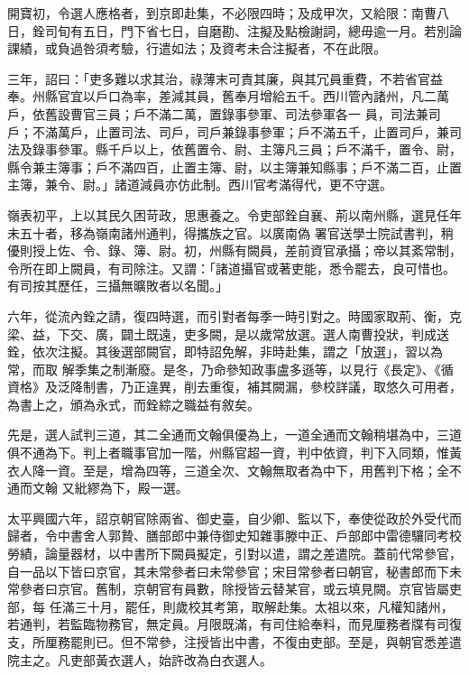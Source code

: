 \begin{pinyinscope}
 開寶初，令選人應格者，到京即赴集，不必限四時；及成甲次，又給限：南曹八日，銓司旬有五日，門下省七日，自磨勘、注擬及點檢謝詞，總毋逾一月。若別論課績，或負過咎須考驗，行遣如法；及資考未合注擬者，不在此限。



 三年，詔曰：「吏多難以求其治，祿薄末可責其廉，與其冗員重費，不若省官益奉。州縣官宜以戶口為率，差減其員，舊奉月增給五千。西川管內諸州，凡二萬戶，依舊設曹官三員；戶不滿二萬，置錄事參軍、司法參軍各一
 員，司法兼司戶；不滿萬戶，止置司法、司戶，司戶兼錄事參軍；戶不滿五千，止置司戶，兼司法及錄事參軍。縣千戶以上，依舊置令、尉、主簿凡三員；戶不滿千，置令、尉，縣令兼主簿事；戶不滿四百，止置主簿、尉，以主簿兼知縣事；戶不滿二百，止置主簿，兼令、尉。」諸道減員亦仿此制。西川官考滿得代，更不守選。



 嶺表初平，上以其民久困苛政，思惠養之。令吏部銓自襄、荊以南州縣，選見任年未五十者，移為嶺南諸州通判，得攜族之官。以廣南偽
 署官送學士院試書判，稍優則授上佐、令、錄、簿、尉。初，州縣有闕員，差前資官承攝；帝以其紊常制，令所在即上闕員，有司除注。又謂：「諸道攝官或著吏能，悉令罷去，良可惜也。有司按其歷任，三攝無曠敗者以名聞。」



 六年，從流內銓之請，復四時選，而引對者每季一時引對之。時國家取荊、衡，克梁、益，下交、廣，闢土既遠，吏多闕，是以歲常放選。選人南曹投狀，判成送銓，依次注擬。其後選部闕官，即特詔免解，非時赴集，謂之「放選」，習以為常，而取
 解季集之制漸廢。是冬，乃命參知政事盧多遜等，以見行《長定》、《循資格》及泛降制書，乃正違異，削去重復，補其闕漏，參校詳議，取悠久可用者，為書上之，頒為永式，而銓綜之職益有敘矣。



 先是，選人試判三道，其二全通而文翰俱優為上，一道全通而文翰稍堪為中，三道俱不通為下。判上者職事官加一階，州縣官超一資，判中依資，判下入同類，惟黃衣人降一資。至是，增為四等，三道全次、文翰無取者為中下，用舊判下格；全不通而文翰
 又紕繆為下，殿一選。



 太平興國六年，詔京朝官除兩省、御史臺，自少卿、監以下，奉使從政於外受代而歸者，令中書舍人郭贄、膳部郎中兼侍御史知雜事滕中正、戶部郎中雷德驤同考校勞績，論量器材，以中書所下闕員擬定，引對以遣，謂之差遣院。蓋前代常參官，自一品以下皆曰京官，其未常參者曰未常參官；宋目常參者曰朝官，秘書郎而下未常參者曰京官。舊制，京朝官有員數，除授皆云替某官，或云填見闕。京官皆屬吏部，每
 任滿三十月，罷任，則歲校其考第，取解赴集。太祖以來，凡權知諸州，若通判，若監臨物務官，無定員。月限既滿，有司住給奉料，而見厘務者牒有司復支，所厘務罷則已。但不常參，注授皆出中書，不復由吏部。至是，與朝官悉差遣院主之。凡吏部黃衣選人，始許改為白衣選人。




\end{pinyinscope}
